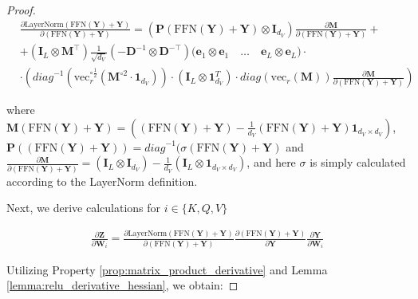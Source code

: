 \documentclass{article}
\begin{document}
\begin{proof}
\begin{align*}
    &\frac{\partial\text{LayerNorm}(\text{FFN}(\mathbf{Y}) + \mathbf{Y})}{\partial (\text{FFN}(\mathbf{Y}) + \mathbf{Y})} = ( \mathbf{P}(\text{FFN}(\mathbf{Y}) + \mathbf{Y}) \otimes \mathbf{I}_{d_V}) \frac{\partial \mathbf{M}}{\partial (\text{FFN}(\mathbf{Y}) + \mathbf{Y})} +\\
    &+ (\mathbf{I}_L\otimes \mathbf{M}^\top)\frac{1}{\sqrt{d_V}}\left(-\mathbf{D}^{-1} \otimes \mathbf{D}^{-\top} \right) \Big(\mathbf{e}_1 \otimes \mathbf{e}_1 \quad \dots  \quad \mathbf{e}_L \otimes \mathbf{e}_L\Big) \cdot\\
    &\cdot \left(\textit{diag}^{-1}(\mathrm{vec}_r^{\circ \frac{1}{2}}(\mathbf{M}^{\circ{2}}\cdot\mathbf{1}_{d_V}))\cdot (\mathbf{I}_L \otimes \mathbf{1}^T_{d_V})\cdot \textit{diag}(\mathrm{vec}_r (\mathbf{M}))\frac{\partial \mathbf{M}}{\partial (\text{FFN}(\mathbf{Y}) + \mathbf{Y})}\right)
\end{align*}

where $\mathbf{M}(\text{FFN}(\mathbf{Y}) + \mathbf{Y}) = ((\text{FFN}(\mathbf{Y}) + \mathbf{Y}) - \frac{1}{d_V}(\text{FFN}(\mathbf{Y}) + \mathbf{Y}) \mathbf{1}_{d_V \times d_V})$, $\mathbf{P}((\text{FFN}(\mathbf{Y}) + \mathbf{Y})) = \textit{diag}^{-1}(\sigma(\text{FFN}(\mathbf{Y}) + \mathbf{Y})$ and $\frac{\partial \mathbf{M}}{\partial(\text{FFN}(\mathbf{Y}) + \mathbf{Y})} = (\mathbf{I}_L \otimes \mathbf{I}_{d_V}) - \frac{1}{d_V}(\mathbf{I}_L \otimes \mathbf{1}_{d_V \times d_V})$, and here $\sigma$ is simply calculated according to the LayerNorm definition.

Next, we derive calculations for $i \in \{ K, Q, V\}$

\begin{align*}
    \frac{\partial\mathbf{Z}}{\partial \mathbf{W}_i} = \frac{\partial \text{LayerNorm}(\text{FFN}(\mathbf{Y}) + \mathbf{Y})}{\partial (\text{FFN}(\mathbf{Y}) + \mathbf{Y})} \frac{\partial (\text{FFN}(\mathbf{Y}) + \mathbf{Y})}{\partial \mathbf{Y}} \frac{\partial \mathbf{Y}}{\partial \mathbf{W}_i}
\end{align*}

Utilizing Property \ref{prop:matrix_product_derivative} and Lemma \ref{lemma:relu_derivative_hessian}, we obtain:


\end{proof}
\end{document}
